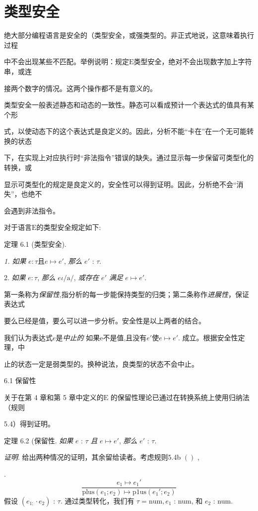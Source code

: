 \chapter{类型安全}

绝大部分编程语言是安全的（类型安全，或强类型的。非正式地说，这意味着执行过程

中不会出现某些不匹配。举例说明：规定$\mathrm{E}$类型安全，绝对不会出现数字加上字符串，或连

接两个数字的情况。这两个操作都不是有意义的。

类型安全一般表述静态和动态的一致性。静态可以看成预计一个表达式的值具有某个形

式，以使动态下的这个表达式是良定义的。因此，分析不能“卡在”在一个无可能转换的状态

下，在实现上对应执行时“非法指令”错误的缺失。通过显示每一步保留可类型化的转换，或

显示可类型化的规定是良定义的，安全性可以得到证明。因此，分析绝不会“消失”，也绝不

会遇到非法指令。

对于语言$\mathrm{E}$的类型安全规定如下:

定理 6.1 (类型安全).

{\it 1. 如果} $e:\tau  且e\mapsto e'$, {\it 那么} $e'$ : $\tau.$

2. {\it 如果} $ e:\tau$, {\it 那么} $e\iota/\mathrm{a}/$, {\it 或存在} $e'$ {\it 满足} $e\mapsto e'.$

第一条称为{\it 保留性},指分析的每一步能保持类型的归类；第二条称作{\it 进展性}，保证表达式

要么已经是值，要么可以进一步分析。安全性是以上两者的结合。

我们认为表达式$e$是{\it 中止的} 如果e不是值,且没有$e'$使$e\mapsto e'$. 成立。根据安全性定理，中

止的状态一定是弱类型的。换种说法，良类型的状态不会中止。

6.1 保留性

关于在第 4 章和第 5 章中定义的$\mathrm{E}$ 的保留性理论已通过在转换系统上使用归纳法（规则


5.4）得到证明。

定理  6.2 (保留性. {\it 如果} $e$ : $\tau$ {\it 且} $e\mapsto e'$, {\it 那么} $e'$ : $\tau.$

{\it 证明}. 给出两种情况的证明，其余留给读者。考虑规则5.4b $()$ ,

.
$$
\frac{e_{1}\mapsto e_{1}'}{\mathrm{p}\mathrm{l}\mathrm{u}\mathrm{s}(e_{1};e_{2})\mapsto \mathrm{p}1\mathrm{u}\mathrm{s}(e_{1}';e_{2})}
$$
假设 $(e_{1;}\cdot e_{2})$ : $\tau$. 通过类型转化，我们有 $\tau=\mathrm{n}\mathrm{u}\mathrm{m}, e_{1}$ : num, 和 $e_{2}$ : num.

